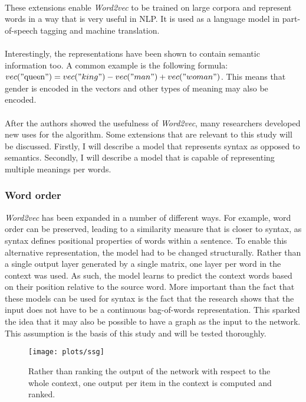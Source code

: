 \documentclass{article}
\begin{document}
 \paragraph{}
 These extensions enable \emph{Word2vec} to be trained on large corpora and represent words in a way that is very useful in NLP. It is used as a language model in part-of-speech tagging and machine translation.
 \paragraph{}
 Interestingly, the representations have been shown to contain semantic information too. A common example is the following formula: $vec("\text{queen}") = vec("king") - vec("man") + vec("woman")$. This means that gender is encoded in the vectors and other types of meaning may also be encoded.
 \paragraph{}
 After the authors showed the usefulness of \emph{Word2vec}, many researchers developed new uses for the algorithm. Some extensions that are relevant to this study will be discussed. Firstly, I will describe a model that represents syntax as opposed to semantics. Secondly, I will describe a model that is capable of representing multiple meanings per words.
 
 \subsubsection{Word order} \label{wordorder}
 \emph{Word2vec} has been expanded in a number of different ways. For example, word order can be preserved, leading to a similarity measure that is closer to syntax, as syntax defines positional properties of words within a sentence\cite{ling2015}. To enable this alternative representation, the model had to be changed structurally. Rather than a single output layer generated by a single matrix, one layer per word in the context was used. As such, the model learns to predict the context words based on their position relative to the source word. More important than the fact that these models can be used for syntax is the fact that the research shows that the input does not have to be a continuous bag-of-words representation. This sparked the idea that it may also be possible to have a graph as the input to the network. This assumption is the basis of this study and will be tested thoroughly.
 
 \begin{figure}[H]
 \centering
 \texttt{[image: plots/ssg]}
 \caption[Syntax Skip-gram]{Rather than ranking the output of the network with respect to the whole context, one output per item in the context is computed and ranked.}
 \label{syntax-skipgram}
 \end{figure}
 
\end{document}

